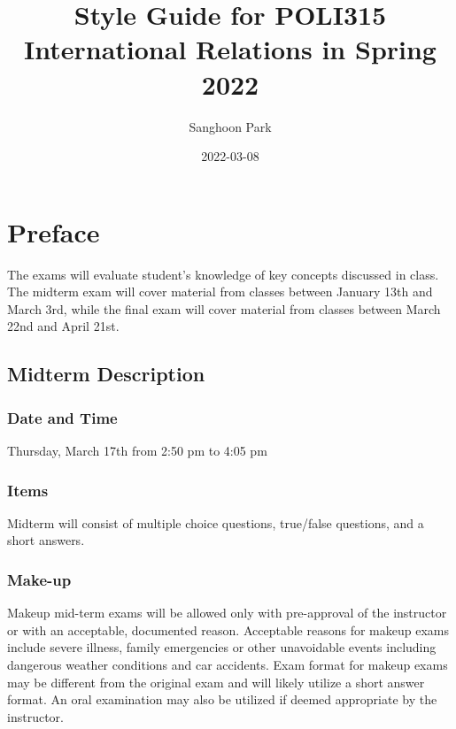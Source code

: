 \documentclass[
]{book}
\title{Style Guide for POLI315 International Relations in Spring 2022}
\author{Sanghoon Park}
\date{2022-03-08}
\begin{document}
\maketitle

{
\setcounter{tocdepth}{1}
\tableofcontents
}
\hypertarget{preface}{%
\chapter*{Preface}\label{preface}}

The exams will evaluate student's knowledge of key concepts discussed in class. The midterm exam will cover material from classes between January 13th and March 3rd, while the final exam will cover material from classes between March 22nd and April 21st.

\hypertarget{midterm-description}{%
\section*{Midterm Description}\label{midterm-description}}

\hypertarget{date-and-time}{%
\subsection*{Date and Time}\label{date-and-time}}

Thursday, March 17th from 2:50 pm to 4:05 pm

\hypertarget{items}{%
\subsection*{Items}\label{items}}

Midterm will consist of multiple choice questions, true/false questions, and a short answers.

\hypertarget{make-up}{%
\subsection*{Make-up}\label{make-up}}

Makeup mid-term exams will be allowed only with pre-approval of the instructor or with an acceptable, documented reason. Acceptable reasons for makeup exams include severe illness, family emergencies or other unavoidable events including dangerous weather conditions and car accidents. Exam format for makeup exams may be different from the original exam and will likely utilize a short answer format. An oral examination may also be utilized if deemed appropriate by the instructor.
\end{document}
